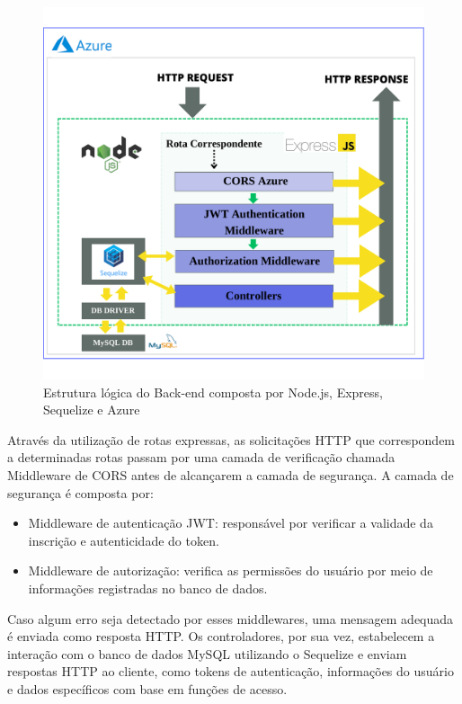 \begin{figure}[h]
    \centering
    \includegraphics[width=1.0\textwidth]{Figuras/Back.pdf}
    \caption{Estrutura lógica do Back-end composta por Node.js, Express, Sequelize e Azure}
    \label{fig:logicBack}
\end{figure}

Através da utilização de rotas expressas, as solicitações HTTP que correspondem a determinadas rotas passam por uma camada de verificação chamada Middleware de CORS antes de alcançarem a camada de segurança.
A camada de segurança é composta por:
\begin{itemize}
  \item Middleware de autenticação JWT: responsável por verificar a validade da inscrição e autenticidade do token.
  \item Middleware de autorização: verifica as permissões do usuário por meio de informações registradas no banco de dados.
\end{itemize}
Caso algum erro seja detectado por esses middlewares, uma mensagem adequada é enviada como resposta HTTP.
Os controladores, por sua vez, estabelecem a interação com o banco de dados MySQL utilizando o Sequelize e enviam respostas HTTP ao cliente, como tokens de autenticação, informações do usuário e dados específicos com base em funções de acesso.



